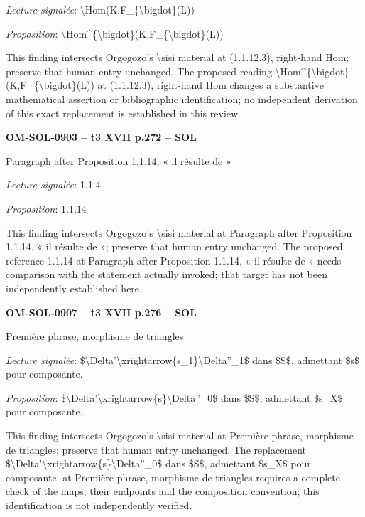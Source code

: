 \emph{Lecture signalée}: \textbackslash{}Hom(K,F\_\{\textbackslash{}bigdot\}(L))\par
\emph{Proposition}: \textbackslash{}Hom\textasciicircum{}\{\textbackslash{}bigdot\}(K,F\_\{\textbackslash{}bigdot\}(L))\par
This finding intersects Orgogozo's \textbackslash{}sisi material at (1.1.12.3), right-hand Hom; preserve that human entry unchanged. The proposed reading \textbackslash{}Hom\textasciicircum{}\{\textbackslash{}bigdot\}(K,F\_\{\textbackslash{}bigdot\}(L)) at (1.1.12.3), right-hand Hom changes a substantive mathematical assertion or bibliographic identification; no independent derivation of this exact replacement is established in this review.\par
\par\noindent\textbf{OM-SOL-0903 -- t3 XVII p.272 -- SOL}\par
Paragraph after Proposition 1.1.14, « il résulte de »\par
\emph{Lecture signalée}: 1.1.4\par
\emph{Proposition}: 1.1.14\par
This finding intersects Orgogozo's \textbackslash{}sisi material at Paragraph after Proposition 1.1.14, « il résulte de »; preserve that human entry unchanged. The proposed reference 1.1.14 at Paragraph after Proposition 1.1.14, « il résulte de » needs comparison with the statement actually invoked; that target has not been independently established here.\par
\par\noindent\textbf{OM-SOL-0907 -- t3 XVII p.276 -- SOL}\par
Première phrase, morphisme de triangles\par
\emph{Lecture signalée}: \$\textbackslash{}Delta'\textbackslash{}xrightarrow\{s\_1\}\textbackslash{}Delta''\_1\$ dans \$S\$, admettant \$s\$ pour composante.\par
\emph{Proposition}: \$\textbackslash{}Delta'\textbackslash{}xrightarrow\{s\}\textbackslash{}Delta''\_0\$ dans \$S\$, admettant \$s\_X\$ pour composante.\par
This finding intersects Orgogozo's \textbackslash{}sisi material at Première phrase, morphisme de triangles; preserve that human entry unchanged. The replacement \$\textbackslash{}Delta'\textbackslash{}xrightarrow\{s\}\textbackslash{}Delta''\_0\$ dans \$S\$, admettant \$s\_X\$ pour composante. at Première phrase, morphisme de triangles requires a complete check of the maps, their endpoints and the composition convention; this identification is not independently verified.\par
